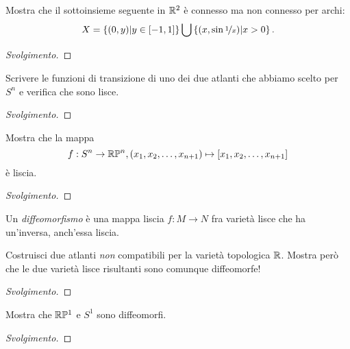\documentclass[a4paper, 12pt, italian]{article}
\begin{document}
\begin{exercise}
Mostra che il sottoinsieme seguente in $\mathbb{R}^2$ è connesso ma non connesso per
archi:
\[
X = \left\{(0, y) | y \in [-1, 1]\right\} \bigcup
\left\{(x, \sin{\nicefrac{1}{x}}) | x > 0\right\}
.\]
\begin{proof}[Svolgimento]

\end{proof}
\end{exercise}

\begin{exercise}
Scrivere le funzioni di transizione di uno dei due atlanti che abbiamo scelto
per $S^n$ e verifica che sono lisce.
\begin{proof}[Svolgimento]

\end{proof}
\end{exercise}

\begin{exercise}
Mostra che la mappa
\[
f: S^n \to \mathbb{R}\mathbb{P}^n, (x_1, x_2, \ldots, x_{n+1}) \mapsto
[x_1, x_2, \ldots, x_{n+1}]
\]
è liscia.
\begin{proof}[Svolgimento]

\end{proof}
\end{exercise}

Un \emph{diffeomorfismo} è una mappa liscia $f: M \to N$ fra varietà lisce
che ha un'inversa, anch'essa liscia.

\begin{exercise}
Costruisci due atlanti \emph{non} compatibili per la varietà topologica $\mathbb{R}$.
Mostra però che le due varietà lisce risultanti sono comunque diffeomorfe!
\begin{proof}[Svolgimento]

\end{proof}
\end{exercise}

\begin{exercise}
Mostra che $\mathbb{R}\mathbb{P}^1$ e $S^1$ sono diffeomorfi.
\begin{proof}[Svolgimento]

\end{proof}
\end{exercise}
\end{document}
